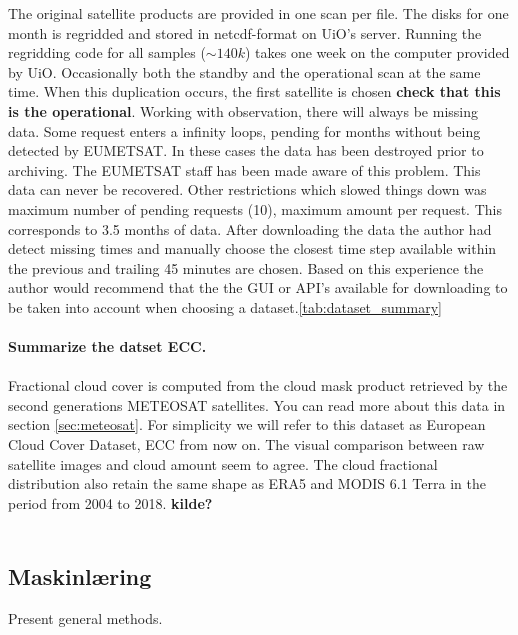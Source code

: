 The original satellite products are provided in one scan per file. The disks for one month is regridded and stored in \acrshort{netcdf}-format on UiO's server. Running the regridding code for all samples ($\sim 140k$) takes one week on the computer provided by UiO. Occasionally both the standby and the operational scan at the same time. When this duplication occurs, the first satellite is chosen \textbf{check that this is the operational}. Working with observation, there will always be missing data. Some request enters a infinity loops, pending for months without being detected by EUMETSAT. In these cases the data has been destroyed prior to archiving. The EUMETSAT staff has been made aware of this problem. This data can never be recovered. Other restrictions which slowed things down was maximum number of pending requests (10), maximum amount per request. This corresponds to 3.5 months of data. After downloading the data the author had detect missing times and manually choose the closest time step available within the previous and trailing 45 minutes are chosen. Based on this experience the author would recommend that the the GUI or API's available for downloading to be taken into account when choosing a dataset.\ref{tab:dataset_summary} \\ \\
\textbf{Summarize the datset ECC.}
\\ \\
Fractional cloud cover is computed from the cloud mask product retrieved by the second generations METEOSAT satellites. You can read more about this data in section \ref{sec:meteosat}. For simplicity we will refer to this dataset as European Cloud Cover Dataset, ECC from now on. The visual comparison between raw satellite images and cloud amount seem to agree. The cloud fractional distribution also retain the same shape as ERA5 and MODIS 6.1 Terra in the period from 2004 to 2018. \textbf{kilde?}
\\ \\
\subsection{Maskinlæring}
Present general methods.

